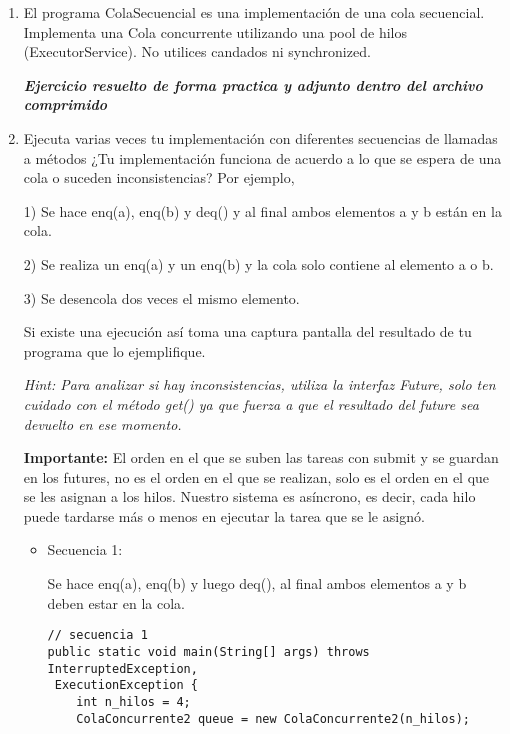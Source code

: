 \begin{enumerate}

\item El programa ColaSecuencial es una implementación de una cola secuencial. Implementa una Cola concurrente utilizando una pool de hilos (ExecutorService). No utilices candados ni synchronized.

\textbf{\textit{Ejercicio resuelto de forma practica y adjunto dentro del archivo comprimido}}

\hfill

\item Ejecuta varias veces tu implementación con diferentes secuencias de llamadas a métodos ¿Tu implementación funciona de acuerdo a lo que se espera de una cola o suceden inconsistencias? Por ejemplo,

1) Se hace enq(a), enq(b) y deq() y al final ambos elementos a y b están en la cola.

2) Se realiza un enq(a) y un enq(b) y la cola solo contiene al elemento a o b.

3) Se desencola dos veces el mismo elemento.

Si existe una ejecución así toma una captura pantalla del resultado de tu programa que lo ejemplifique.

\hfill

\textit{Hint: Para analizar si hay inconsistencias, utiliza la interfaz Future, solo ten cuidado con el método get() ya que fuerza a que el resultado del future sea devuelto en ese momento.}

\hfill

\textbf{Importante:} El orden en el que se suben las tareas con submit y se guardan en los futures, no es el orden en el que se realizan, solo es el orden en el que se les asignan a los hilos. Nuestro sistema es asíncrono, es decir, cada hilo puede tardarse más o menos en ejecutar la tarea que se le asignó.\\

\begin{itemize}
    \item Secuencia 1:

    Se hace enq(a), enq(b) y luego deq(), al final ambos elementos a y b deben estar en la cola.

    \begin{verbatim}
// secuencia 1
public static void main(String[] args) throws InterruptedException, 
 ExecutionException {
    int n_hilos = 4;
    ColaConcurrente2 queue = new ColaConcurrente2(n_hilos);
        

\end{verbatim}
\end{itemize}
\end{enumerate}
